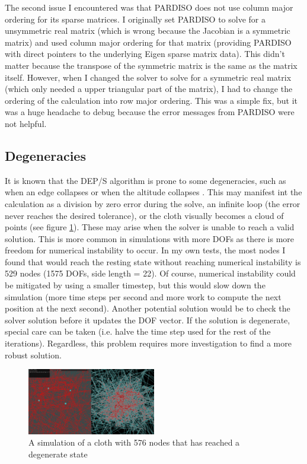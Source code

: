 \documentclass[letterpaper, 10 pt, conference]{ieeeconf}  %
\begin{document}
        The second issue I encountered was that PARDISO does not use column major ordering for its sparse matrices. I originally set PARDISO to solve for a unsymmetric real matrix (which is wrong because the Jacobian is a symmetric matrix) and used column major ordering for that matrix (providing PARDISO with direct pointers to the underlying Eigen sparse matrix data). This didn't matter because the transpose of the symmetric matrix is the same as the matrix itself. However, when I changed the solver to solve for a symmetric real matrix (which only needed a upper triangular part of the matrix), I had to change the ordering of the calculation into row major ordering. This was a simple fix, but it was a huge headache to debug because the error messages from PARDISO were not helpful.

\subsection{Degeneracies}
        It is known that the DEP/S algorithm is prone to some degeneracies, such as when an edge collapses or when the altitude collapses \cite{Tamstorf2013discrete}. This may manifest int the calculation as a division by zero error during the solve, an infinite loop (the error never reaches the desired tolerance), or the cloth visually becomes a cloud of points (see figure \ref{fig:chaos}). These may arise when the solver is unable to reach a valid solution. This is more common in simulations with more DOFs as there is more freedom for numerical instability to occur. In my own tests, the most nodes I found that would reach the resting state without reaching numerical instability is 529 nodes (1575 DOFs, side length = 22). Of course, numerical instability could be mitigated by using a smaller timestep, but this would slow down the simulation (more time steps per second and more work to compute the next position at the next second). Another potential solution would be to check the solver solution before it updates the DOF vector. If the solution is degenerate, special care can be taken (i.e. halve the time step used for the rest of the iterations). Regardless, this problem requires more investigation to find a more robust solution.

\begin{figure}
        \centering
        \includegraphics[width=0.5\textwidth]{chaos1.png}
        \caption{A simulation of a cloth with 576 nodes that has reached a degenerate state} \label{fig:chaos}
\end{figure}
\end{document}
